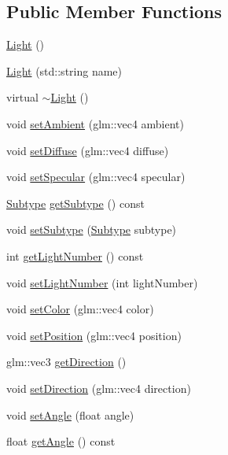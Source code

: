 \subsection*{Public Member Functions}
\begin{DoxyCompactItemize}
\item 
\hyperlink{classLight_aeb5df09a25a32f19fdffa761268ba24f}{Light} ()
\item 
\hyperlink{classLight_a91ebda8220b23dd81e03e9a3d74038de}{Light} (std\+::string name)
\item 
virtual \hyperlink{classLight_ad0e59fad13bb6cfadc25b2c477e9ddc7}{$\sim$\+Light} ()
\item 
void \hyperlink{classLight_a7a9f3b7fa887fc05f09bdbc686582d91}{set\+Ambient} (glm\+::vec4 ambient)
\item 
void \hyperlink{classLight_adc52e832ae3c0319a836488b0ef548a4}{set\+Diffuse} (glm\+::vec4 diffuse)
\item 
void \hyperlink{classLight_a578d1435c4dd9a940c68ea34b32197e1}{set\+Specular} (glm\+::vec4 specular)
\item 
\hyperlink{classLight_a7b5feeb01dd53961e0e523f3d2f5fa7f}{Subtype} \hyperlink{classLight_abe7e9dce915c21865968d0639cde590f}{get\+Subtype} () const
\item 
void \hyperlink{classLight_a853de52827212e0a3940b24b3474b397}{set\+Subtype} (\hyperlink{classLight_a7b5feeb01dd53961e0e523f3d2f5fa7f}{Subtype} subtype)
\item 
int \hyperlink{classLight_ad718ac25026b144b6cd1366742b18468}{get\+Light\+Number} () const
\item 
void \hyperlink{classLight_aa2da7de405831666a6af15c6244beed8}{set\+Light\+Number} (int light\+Number)
\item 
void \hyperlink{classLight_aaf638193c905de52570362eccd920714}{set\+Color} (glm\+::vec4 color)
\item 
void \hyperlink{classLight_a568e3fd99b6863f462071cf872c3cde0}{set\+Position} (glm\+::vec4 position)
\item 
glm\+::vec3 \hyperlink{classLight_ae10c348537ea57b655960f027731fbf3}{get\+Direction} ()
\item 
void \hyperlink{classLight_aa32662da42afe808259609126aabe7f1}{set\+Direction} (glm\+::vec4 direction)
\item 
void \hyperlink{classLight_a95eee24e173aa9e0432a9c1324f4faec}{set\+Angle} (float angle)
\item 
float \hyperlink{classLight_a1a69147d826c7ab474a56d91b5845c47}{get\+Angle} () const
\item 

\end{DoxyCompactItemize}
